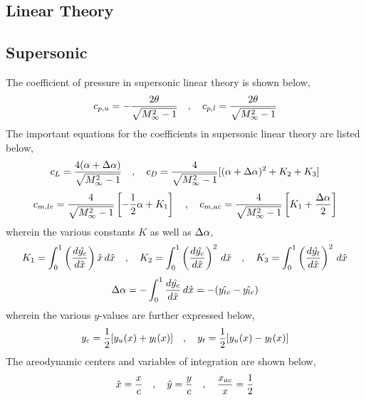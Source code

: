 \documentclass[class=report, 12pt, crop=false]{standalone}
\begin{document}
\begin{center}
\section{Linear Theory}
\begin{comment}
\end{comment}
\subsection{Supersonic}
\begin{comment}
\end{comment}
The coefficient of pressure in supersonic linear theory is shown below,
$$c_{p,u} = -\frac{2\theta}{\sqrt{M_\infty^2-1}} \quad,\quad c_{p,l} = \frac{2\theta}{\sqrt{M_\infty^2-1}}$$
The important equations for the coefficients in supersonic linear theory are listed below,
$$c_L = \frac{4(\alpha+\Delta \alpha)}{\sqrt{M_\infty^2-1}} \quad,\quad c_D = \frac{4}{\sqrt{M_\infty^2-1}}[(\alpha+\Delta \alpha)^2+K_2+K_3]$$
$$c_{m,le} = \frac{4}{\sqrt{M_\infty^2-1}}\left[-\frac{1}{2}\alpha+K_1\right] \quad,\quad c_{m,ac} = \frac{4}{\sqrt{M_\infty^2-1}}\left[K_1+\frac{\Delta\alpha}{2}\right]$$
wherein the various constants $K$ as well as $\Delta \alpha$,
$$K_1 = \int^{1}_{0}\left(\frac{d\hat{y_c}}{d\hat{x}}\right)\hat{x}\,d\hat{x} \quad,\quad K_2 = \int^{1}_{0}\left(\frac{d\hat{y_c}}{d\hat{x}}\right)^2\,d\hat{x} \quad,\quad K_3 = \int^{1}_{0}\left(\frac{d\hat{y_t}}{d\hat{x}}\right)^2\,d\hat{x}$$
$$\Delta \alpha = -\int^{1}_{0}\frac{d\hat{y_c}}{d\hat{x}}\,d\hat{x} = -(\hat{y_{te}}-\hat{y_{le}})$$
wherein the various $y$-values are further expressed below,
$$y_c = \frac{1}{2}[y_u(x)+y_l(x)] \quad,\quad y_t = \frac{1}{2}[y_u(x)-y_l(x)]$$
The areodynamic centers and variables of integration are shown below,
$$\hat{x} = \frac{x}{c} \quad,\quad \hat{y} = \frac{y}{c} \quad,\quad \frac{x_{ac}}{x}=\frac{1}{2}$$

\end{center}
\end{document}
